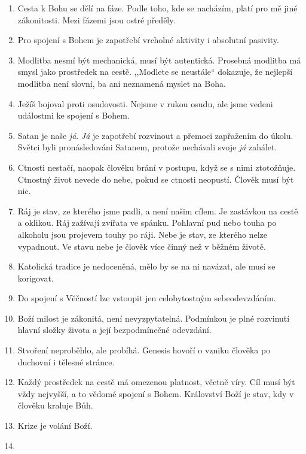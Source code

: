 \begin{enumerate}
  \item{
      Cesta k Bohu se dělí na fáze. Podle toho, kde se nacházím, platí pro mě
      jiné zákonitosti.  Mezi fázemi jsou ostré předěly.
  }
  \item{
      Pro spojení s Bohem je zapotřebí vrcholné aktivity i absolutní pasivity.
  }
  \item{
      Modlitba nesmí být mechanická, musí být autentická.
      Prosebná modlitba má smysl jako prostředek na cestě.
      ,,Modlete se neustále`` dokazuje, že nejlepší modlitba není slovní, ba ani neznamená myslet na Boha.
  }
  \item{
    Ježíš bojoval proti osudovosti.
    Nejsme v rukou osudu, ale jsme vedeni událostmi ke spojení s Bohem.
  }
  \item{
    Satan je naše \textit{já}.
    \textit{Já} je zapotřebí rozvinout a přemoci zapřažením do úkolu.
    Světci byli pronásledováni Satanem, protože nechávali svoje \textit{já} zahálet.
  }
  \item{
    Ctnosti nestačí, naopak člověku brání v postupu, když se s nimi ztotožňuje.
    Ctnostný život nevede do nebe, pokud se ctnosti neopustí.
    Člověk musí být nic.
  }
  \item{
    Ráj je stav, ze kterého jsme padli, a není našim cílem.
    Je zastávkou na cestě a oklikou.
    Ráj zažívají zvířata ve spánku.
    Pohlavní pud nebo touha po alkoholu jsou projevem touhy po ráji.
    Nebe je stav, ze kterého nelze vypadnout.
    Ve stavu nebe je člověk více činný než v běžném životě.
  }
  \item{
    Katolická tradice je nedoceněná, mělo by se na ni navázat, ale musí se korigovat.
  }
  \item{
    Do spojení s Věčností lze vstoupit jen celobytostným sebeodevzdáním.
  }
  \item{
    Boží milost je zákonitá, není nevyzpytatelná.
    Podmínkou je plné rozvinutí hlavní složky života a její bezpodmínečné odevzdání.
  }
  \item{
    Stvoření neproběhlo, ale probíhá.
    Genesis hovoří o vzniku člověka po duchovní i tělesné stránce.
  }
  \item{
    Každý prostředek na cestě má omezenou platnost, včetně víry.
    Cíl musí být vždy nejvyšší, a to vědomé spojení s Bohem.
    Království Boží je stav, kdy v člověku kraluje Bůh.
  }
  \item{
    Krize je volání Boží.
  }
  \item{
}
\end{enumerate}
